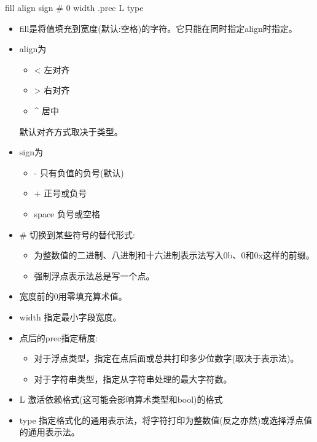 \begin{shell}
fill align sign # 0 width .prec L type
\end{shell}

\begin{itemize}
\item 
fill是将值填充到宽度(默认:空格)的字符。它只能在同时指定align时指定。

\item 
align为

\begin{itemize}
\item 
< 左对齐

\item 
> 右对齐

\item 
\^{} 居中
\end{itemize}

默认对齐方式取决于类型。

\item 
sign为

\begin{itemize}
\item 
- 只有负值的负号(默认)

\item 
+ 正号或负号

\item 
space 负号或空格
\end{itemize}

\item 
\# 切换到某些符号的替代形式:

\begin{itemize}
\item 
为整数值的二进制、八进制和十六进制表示法写入0b、0和0x这样的前缀。

\item 
强制浮点表示法总是写一个点。
\end{itemize}

\item 
宽度前的0用零填充算术值。

\item 
width 指定最小字段宽度。

\item 
点后的prec指定精度:

\begin{itemize}
\item 
对于浮点类型，指定在点后面或总共打印多少位数字(取决于表示法)。

\item 
对于字符串类型，指定从字符串处理的最大字符数。
\end{itemize}

\item 
L 激活依赖格式(这可能会影响算术类型和bool)的格式

\item 
type 指定格式化的通用表示法，将字符打印为整数值(反之亦然)或选择浮点值的通用表示法。
\end{itemize}

